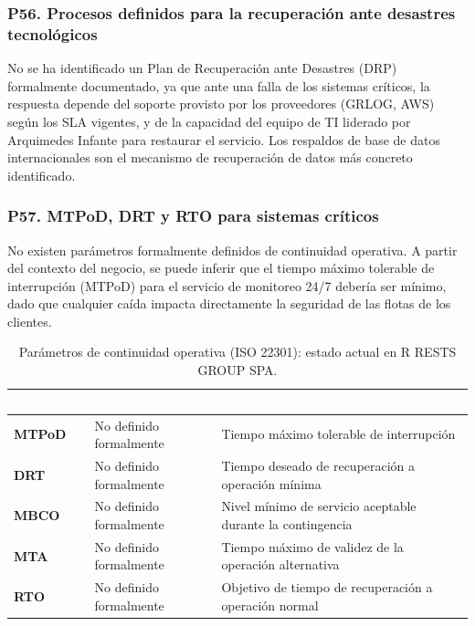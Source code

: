 \documentclass[12pt]{article}
\begin{document}
\subsubsection*{\textbf{P56. Procesos definidos para la recuperaci\'on ante desastres tecnol\'ogicos}}

No se ha identificado un Plan de Recuperaci\'on ante Desastres (DRP) formalmente
documentado, ya que ante una falla de los sistemas cr\'iticos, la respuesta depende del soporte
provisto por los proveedores (GRLOG, AWS) seg\'un los SLA vigentes, y de la capacidad del
equipo de TI liderado por Arquimedes Infante para restaurar el servicio. Los respaldos de
base de datos internacionales son el mecanismo de recuperaci\'on de datos m\'as concreto
identificado.

\subsubsection*{\textbf{P57. MTPoD, DRT y RTO para sistemas cr\'iticos}}

No existen par\'ametros formalmente definidos de continuidad operativa. A partir del
contexto del negocio, se puede inferir que el tiempo m\'aximo tolerable de interrupci\'on
(MTPoD) para el servicio de monitoreo 24/7 deber\'ia ser m\'inimo, dado que cualquier
ca\'ida impacta directamente la seguridad de las flotas de los clientes.

\begin{table}[H]
\centering
\renewcommand{\arraystretch}{1.4}
\begin{tabularx}{\textwidth}{>{\bfseries}l >{\centering\arraybackslash}p{3cm} X}
\toprule
\rowcolor{headerblue}
\textcolor{white}{\textbf{Par\'ametro}} &
\textcolor{white}{\textbf{Valor definido}} &
\textcolor{white}{\textbf{Descripci\'on}} \\
\midrule
MTPoD & No definido formalmente & Tiempo m\'aximo tolerable de interrupci\'on \\
\rowcolor{rowgray}
DRT   & No definido formalmente & Tiempo deseado de recuperaci\'on a operaci\'on m\'inima \\
MBCO  & No definido formalmente & Nivel m\'inimo de servicio aceptable durante la contingencia \\
\rowcolor{rowgray}
MTA   & No definido formalmente & Tiempo m\'aximo de validez de la operaci\'on alternativa \\
RTO   & No definido formalmente & Objetivo de tiempo de recuperaci\'on a operaci\'on normal \\
\bottomrule
\end{tabularx}
\caption{Par\'ametros de continuidad operativa (ISO 22301): estado actual en R RESTS GROUP SPA.}
\end{table}
\end{document}
